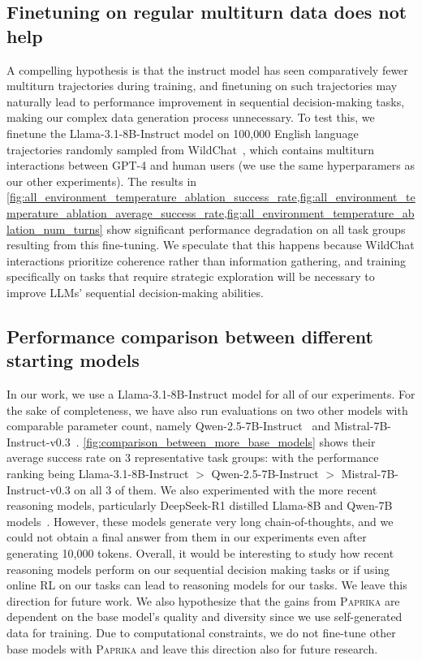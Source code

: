 \documentclass{article}
\newcommand{\ours}[1]{\textsc{Paprika}}
\theoremstyle{plain}
\theoremstyle{definition}
\theoremstyle{remark}
\begin{document}
\subsection{Finetuning on regular multiturn data does not help}
A compelling hypothesis is that the instruct model has seen comparatively fewer multiturn trajectories during training, and finetuning on such trajectories may naturally lead to performance improvement in sequential decision-making tasks, making our complex data generation process unnecessary. To test this, we finetune the Llama-3.1-8B-Instruct model on 100,000 English language trajectories randomly sampled from WildChat~\citep{zhao2024wildchat1mchatgptinteraction}, which contains multiturn interactions between GPT-4 and human users (we use the same hyperparamers as our other experiments). The results in \cref{fig:all_environment_temperature_ablation_success_rate,fig:all_environment_temperature_ablation_average_success_rate,fig:all_environment_temperature_ablation_num_turns} show significant performance degradation on all task groups resulting from this fine-tuning. We speculate that this happens because WildChat interactions prioritize coherence rather than information gathering, and training specifically on tasks that require strategic exploration will be necessary to improve LLMs' sequential decision-making abilities.
\subsection{Performance comparison between different starting models}
In our work, we use a Llama-3.1-8B-Instruct model for all of our experiments. For the sake of completeness, we have also run evaluations on two other models with comparable parameter count, namely Qwen-2.5-7B-Instruct~\citep{qwen2025qwen25technicalreport} and Mistral-7B-Instruct-v0.3~\citep{jiang2023mistral7b}. \cref{fig:comparison_between_more_base_models} shows their average success rate on 3 representative task groups: with the performance ranking being Llama-3.1-8B-Instruct $>$ Qwen-2.5-7B-Instruct $>$ Mistral-7B-Instruct-v0.3 on all 3 of them. We also experimented with the more recent reasoning models, particularly DeepSeek-R1 distilled Llama-8B and Qwen-7B models~\citep{deepseekai2025deepseekr1incentivizingreasoningcapability}. However, these models generate very long chain-of-thoughts, and we could not obtain a final answer from them in our experiments even after generating 10,000 tokens. Overall, it would be interesting to study how recent reasoning models perform on our sequential decision making tasks or if using online RL on our tasks can lead to reasoning models for our tasks. We leave this direction for future work. We also hypothesize that the gains from \ours{} are dependent on the base model's quality and diversity since we use self-generated data for training. Due to computational constraints, we do not fine-tune other base models with \ours{} and leave this direction also for future research.
\newpage
\end{document}
